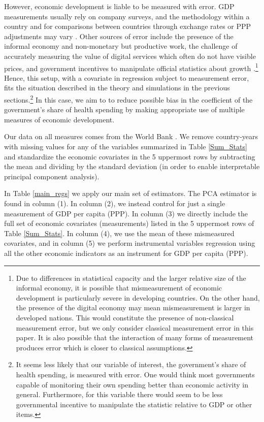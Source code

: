 \documentclass[10pt]{article}
\begin{document}
        However, economic development is liable to be measured with error. GDP measurements usually rely on company surveys, and the methodology within a country and for comparisons between countries through exchange rates or PPP adjustments may vary \citep{grishin_main_2019}. Other sources of error include the presence of the informal economy and non-monetary but productive work, the challenge of accurately measuring the value of digital services which often do not have visible prices, and government incentives to manipulate official statistics about growth \citep{charmes_informal_2012,ahmad_can_2017,nakamura_are_2016}.\footnote{Due to differences in statistical capacity and the larger relative size of the informal economy, it is possible that mismeasurement of economic development is particularly severe in developing countries. On the other hand, the presence of the digital economy may mean mismeasurement is larger in developed nations. This would constitute the presence of non-classical measurement error, but we only consider classical measurement error in this paper. It is also possible that the interaction of many forms of measurement produces error which is closer to classical assumptions.} Hence, this setup, with a covariate in regression subject to measurement error, fits the situation described in the theory and simulations in the previous sections.\footnote{It seems less likely that our variable of interest, the government's share of health spending, is measured with error. One would think most governments capable of monitoring their own spending better than economic activity in general. Furthermore, for this variable there would seem to be less governmental incentive to manipulate the statistic relative to GDP or other items.} In this case, we aim to to reduce possible bias in the coefficient of the government's share of health spending by making appropriate use of multiple measures of economic development.

        Our data on all measures comes from the World Bank \citep{the_world_bank_indicators_2021}. We remove country-years with missing values for any of the variables summarized in Table \ref{Sum_Stats} and standardize the economic covariates in the 5 uppermost rows by subtracting the mean and dividing by the standard deviation (in order to enable interpretable principal component analysis).

        

        In Table \ref{main_regs} we apply our main set of estimators. The PCA estimator is found in column (1). In column (2), we instead control for just a single measurement of GDP per capita (PPP). In column (3) we directly include the full set of economic covariates (measurements) listed in the 5 uppermost rows of Table \ref{Sum_Stats}. In column (4), we use the mean of these mismeasured covariates, and in column (5) we perform instrumental variables regression using all the other economic indicators as an instrument for GDP per capita (PPP).
\end{document}
